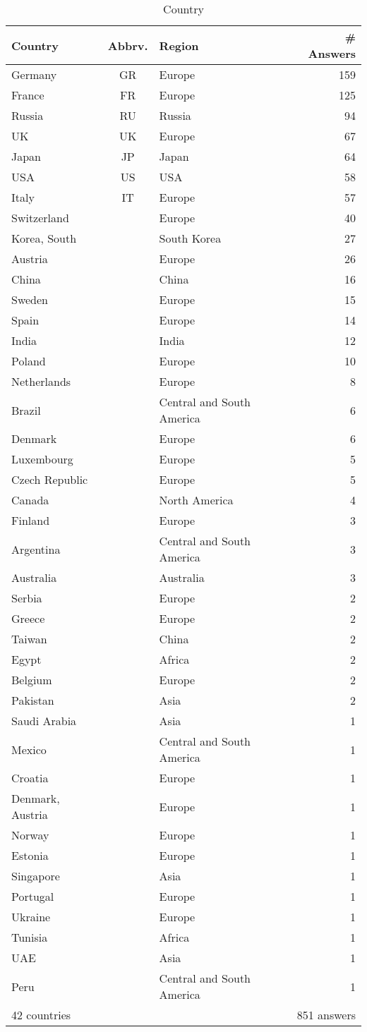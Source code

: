 \begin{table}[htb]%
\begin{center}%
\caption{Country}\label{tab:countries}%
\begin{tabular}{l|c|l|r}%
\hline%
Country & Abbrv. & Region & \# Answers \\%
\hline%
Germany&GR&Europe&159\\%
France&FR&Europe&125\\%
Russia&RU&Russia&94\\%
UK&UK&Europe&67\\%
Japan&JP&Japan&64\\%
USA&US&USA&58\\%
Italy&IT&Europe&57\\%
\hline%
Switzerland&&Europe&40\\%
Korea, South&&South Korea&27\\%
Austria&&Europe&26\\%
China&&China&16\\%
Sweden&&Europe&15\\%
Spain&&Europe&14\\%
India&&India&12\\%
Poland&&Europe&10\\%
Netherlands&&Europe&8\\%
Brazil&&Central and South America&6\\%
Denmark&&Europe&6\\%
Luxembourg&&Europe&5\\%
Czech Republic&&Europe&5\\%
Canada&&North America&4\\%
Finland&&Europe&3\\%
Argentina&&Central and South America&3\\%
Australia&&Australia&3\\%
Serbia&&Europe&2\\%
Greece&&Europe&2\\%
Taiwan&&China&2\\%
Egypt&&Africa&2\\%
Belgium&&Europe&2\\%
Pakistan&&Asia&2\\%
Saudi Arabia&&Asia&1\\%
Mexico&&Central and South America&1\\%
Croatia&&Europe&1\\%
Denmark, Austria&&Europe&1\\%
Norway&&Europe&1\\%
Estonia&&Europe&1\\%
Singapore&&Asia&1\\%
Portugal&&Europe&1\\%
Ukraine&&Europe&1\\%
Tunisia&&Africa&1\\%
UAE&&Asia&1\\%
Peru&&Central and South America&1\\%
\hline%
42 countries & & & 851 answers \\%
\hline%
\end{tabular}%
\end{center}%
\end{table}%
